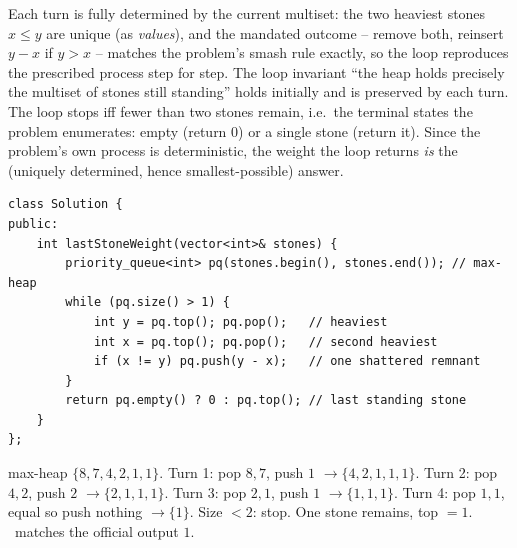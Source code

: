 \begin{proofbox}
Each turn is fully determined by the current multiset: the two heaviest stones $x\le y$ are unique (as
\emph{values}), and the mandated outcome -- remove both, reinsert $y-x$ if $y>x$ -- matches the problem's
smash rule exactly, so the loop reproduces the prescribed process step for step. The loop invariant ``the
heap holds precisely the multiset of stones still standing'' holds initially and is preserved by each turn.
The loop stops iff fewer than two stones remain, i.e.\ the terminal states the problem enumerates: empty
(return $0$) or a single stone (return it). Since the problem's own process is deterministic, the weight
the loop returns \emph{is} the (uniquely determined, hence smallest-possible) answer. \end{proofbox}

\begin{lstlisting}[caption={Last Stone Weight -- two pops and a conditional push on a max-heap (LeetCode 1046)}, label={lst:c07-stone-soln}]
class Solution {
public:
    int lastStoneWeight(vector<int>& stones) {
        priority_queue<int> pq(stones.begin(), stones.end()); // max-heap
        while (pq.size() > 1) {
            int y = pq.top(); pq.pop();   // heaviest
            int x = pq.top(); pq.pop();   // second heaviest
            if (x != y) pq.push(y - x);   // one shattered remnant
        }
        return pq.empty() ? 0 : pq.top(); // last standing stone
    }
};
\end{lstlisting}

\begin{tracebox}[Official sample: \texttt{stones = [2,7,4,1,8,1]} (the pile $S$)]
max-heap $\{8,7,4,2,1,1\}$. Turn 1: pop $8,7$, push $1$ $\to\{4,2,1,1,1\}$. Turn 2: pop $4,2$, push $2$
$\to\{2,1,1,1\}$. Turn 3: pop $2,1$, push $1$ $\to\{1,1,1\}$. Turn 4: pop $1,1$, equal so push nothing
$\to\{1\}$. Size $<2$: stop. One stone remains, top $=1$. \checkmark\ matches the official output $1$.
\end{tracebox}


